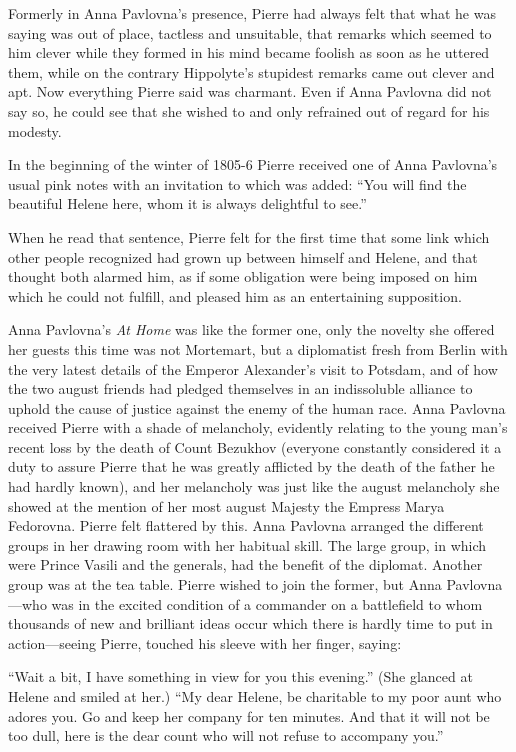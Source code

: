 Formerly in Anna Pavlovna's presence, Pierre had always felt that
what he was saying was out of place, tactless and unsuitable,
that remarks which seemed to him clever while they formed in his
mind became foolish as soon as he uttered them, while on the
contrary Hippolyte's stupidest remarks came out clever and
apt. Now everything Pierre said was charmant. Even if Anna
Pavlovna did not say so, he could see that she wished to and only
refrained out of regard for his modesty.

In the beginning of the winter of 1805-6 Pierre received one of
Anna Pavlovna's usual pink notes with an invitation to which was
added: ``You will find the beautiful Helene here, whom it is
always delightful to see.''

When he read that sentence, Pierre felt for the first time that
some link which other people recognized had grown up between
himself and Helene, and that thought both alarmed him, as if some
obligation were being imposed on him which he could not fulfill,
and pleased him as an entertaining supposition.

Anna Pavlovna's \emph{At Home} was like the former one, only the
novelty she offered her guests this time was not Mortemart, but a
diplomatist fresh from Berlin with the very latest details of the
Emperor Alexander's visit to Potsdam, and of how the two august
friends had pledged themselves in an indissoluble alliance to
uphold the cause of justice against the enemy of the human
race. Anna Pavlovna received Pierre with a shade of melancholy,
evidently relating to the young man's recent loss by the death of
Count Bezukhov (everyone constantly considered it a duty to
assure Pierre that he was greatly afflicted by the death of the
father he had hardly known), and her melancholy was just like the
august melancholy she showed at the mention of her most august
Majesty the Empress Marya Fedorovna. Pierre felt flattered by
this. Anna Pavlovna arranged the different groups in her drawing
room with her habitual skill. The large group, in which were
Prince Vasili and the generals, had the benefit of the
diplomat. Another group was at the tea table.  Pierre wished to
join the former, but Anna Pavlovna---who was in the excited
condition of a commander on a battlefield to whom thousands of
new and brilliant ideas occur which there is hardly time to put
in action---seeing Pierre, touched his sleeve with her finger,
saying:

``Wait a bit, I have something in view for you this evening.''
(She glanced at Helene and smiled at her.) ``My dear Helene, be
charitable to my poor aunt who adores you. Go and keep her
company for ten minutes.  And that it will not be too dull, here
is the dear count who will not refuse to accompany you.''

